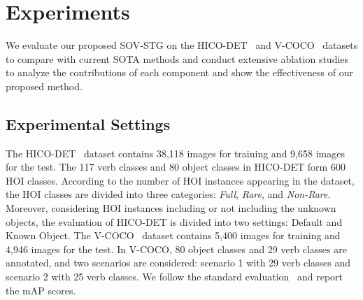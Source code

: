 \documentclass[10pt,twocolumn,letterpaper]{article}
\begin{document}
\section{Experiments}

We evaluate our proposed SOV-STG on the HICO-DET~\cite{chao2018learning} and V-COCO~\cite{gupta2015visual} datasets to compare with current SOTA methods and conduct extensive ablation studies to analyze the contributions of each component and show the effectiveness of our proposed method.

\subsection{Experimental Settings}

\quad The HICO-DET~\cite{chao2018learning} dataset contains 38,118 images for training and 9,658 images for the test.
The 117 verb classes and 80 object classes in HICO-DET form 600 HOI classes.
According to the number of HOI instances appearing in the dataset, the HOI classes are divided into three categories: \textit{Full}, \textit{Rare}, and \textit{Non-Rare}.
Moreover, considering HOI instances including or not including the unknown objects, the evaluation of HICO-DET is divided into two settings: Default and Known Object.
The V-COCO~\cite{gupta2015visual} dataset contains 5,400 images for training and 4,946 images for the test.
In V-COCO, 80 object classes and 29 verb classes are annotated, and two scenarios are considered: scenario 1 with 29 verb classes and scenario 2 with 25 verb classes.
We follow the standard evaluation~\cite{chao2018learning} and report the mAP scores.
\end{document}
